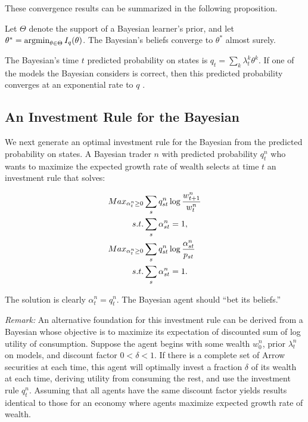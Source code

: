 These convergence results can be summarized in the following proposition. 
\begin{proposition}\label{thm:bayesian-convergence}
    Let $\Theta$ denote the support of a Bayesian learner's prior, and let 
    $
    \theta^* = \operatorname*{argmin}_{\theta \in \Theta} I_q(\theta)
    $. 
    The Bayesian's beliefs converge to $\theta^*$ almost surely. 
\end{proposition}

The Bayesian's time $t$ predicted probability on states is $q_t = \sum_k \lambda^k_t \theta^k$. If one of the models the Bayesian considers is correct, then this predicted probability converges at an exponential rate to $q$ .

\subsection{An Investment Rule for the Bayesian}

We next generate an optimal investment rule for the Bayesian from the predicted probability on states. A Bayesian trader $n$ with predicted probability $q^n_t$ who wants to maximize the expected growth rate of wealth selects at time $t$ an investment rule that solves:

\begin{align}
Max_{\alpha^n_{t}\geq 0} & \sum_s {q^n_{st}} \log\frac{w^n_{t+1}}{w^n_{t}} \label{eq:bays-investment-rule-w} \\
s.t. &\sum_s \alpha^n_{st} = 1 \notag, \\
Max_{\alpha^n_{t}\geq 0} & \sum_s {q^n_{st}} \log\frac{\alpha^n_{st}}{p_{st}} \label{eq:bays-investment-rule-p} \\
s.t. &\sum_s \alpha^n_{st} = 1. \notag
\end{align}

\noindent The solution is clearly $\alpha^n_t = q^n_t$. The Bayesian agent should ``bet its beliefs.'' 
\bigskip

\noindent
    {\em Remark:} An alternative foundation for this investment rule can be derived from a Bayesian whose objective is to maximize its expectation of discounted sum of log utility of consumption. 
    Suppose the agent begins with some wealth $w^n_0$, prior $\lambda^n_t$ on models, and discount factor $0 < \delta < 1$. If there is a complete set of Arrow securities at each time, this agent will optimally invest a fraction $\delta$ of its wealth at each time, deriving utility from consuming the rest, and use the investment rule $q^n_t$. Assuming that all agents have the same discount factor yields results identical to those for an economy where agents maximize expected growth rate of wealth.


